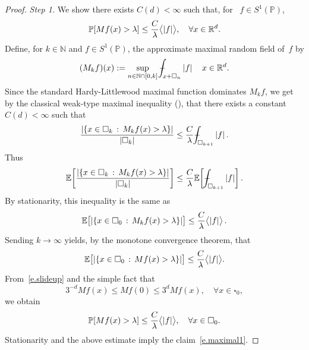 \documentclass[11pt]{article} %
\let\oldsquare\square %
\renewcommand{\square}{\oldsquare}
\numberwithin{equation}{section}
\theoremstyle{definition}
\let\originalleft\left
\let\originalright\right
\renewcommand{\left}{\mathopen{}\mathclose\bgroup\originalleft}
\renewcommand{\right}{\aftergroup\egroup\originalright}
\newcommand*{\N}{\ensuremath{\mathbb{N}}}
\newcommand*{\Rd}{\ensuremath{\mathbb{R}^d}}
\newcommand{\cu}{\square}
\renewcommand{\P}{\mathbb{P}}
\newcommand{\E}{\mathbb{E}}
\def\Xint#1{\mathchoice
{\XXint\displaystyle\textstyle{#1}}%
{\XXint\textstyle\scriptstyle{#1}}%
{\XXint\scriptstyle\scriptscriptstyle{#1}}%
{\XXint\scriptscriptstyle\scriptscriptstyle{#1}}%
\!\int}
\def\XXint#1#2#3{{\setbox0=\hbox{$#1{#2#3}{\int}$}
\vcenter{\hbox{$#2#3$}}\kern-.5\wd0}}
\def\fint{\Xint-}
\begin{document}
\begin{proof}
\emph{Step 1.}
We show there exists $C(d)<\infty$ such that, for~ $f\in S^1(\P)$,
\begin{equation}
\label{e.maximal1}
\P \left[ Mf(x) > \lambda \right] \leq \frac{C}{\lambda} \bigl \langle |f| \bigr\rangle, \quad \forall x\in \Rd.
\end{equation}
Define, for  $k\in\N$  and $f\in S^1(\P)$, the approximate maximal random field of~$f$ by 
\begin{equation}
(M_kf)(x):= 
\sup_{n\in \N \cap [0,k]} 
\fint_{x+\cu_n} |f| \, \quad x\in \Rd.
\end{equation}
Since the standard Hardy-Littlewood maximal function dominates $M_kf$, we get by the classical weak-type maximal inequality (\cite[Theorem 3.17]{Folland}), that there exists a constant~$C(d)<\infty$ such that 
\begin{equation}
\frac{\left| \left\{ x \in \cu_k \,:\, M_kf(x) > \lambda \right\} \right|}
{|\cu_k|}
\leq 
\frac{C}{\lambda}
\fint_{\cu_{k+1}} |f|\,. 
\end{equation}
Thus 
\begin{equation}
\E\left[ \frac{\left| \left\{ x \in \cu_k \,:\, M_kf(x) > \lambda \right\} \right|}
{|\cu_k|} \right]
\leq 
\frac{C}{\lambda}
\E \biggl[ 
\fint_{\cu_{k+1}} |f| \biggr]\,.
\end{equation}
By stationarity, this inequality is the same as 
\begin{equation}
\E\bigl[ \left| \left\{ x \in \cu_0 \,:\, M_kf(x) > \lambda \right\} \right| \bigr]
\leq
\frac{C}{\lambda} \bigl \langle |f| \bigr\rangle\,. 
\end{equation}
Sending $k\to \infty$ yields, by the monotone convergence theorem, that
\begin{equation}
\label{e.slideup}
\E\bigl[  \left| \left\{ x \in \cu_0 \,:\, Mf(x) > \lambda \right\} \right| \bigr]
\leq
\frac{C}{\lambda} \bigl \langle |f| \bigr\rangle. 
\end{equation}
From~\eqref{e.slideup} and the simple fact that
\begin{equation}
3^{-d} Mf (x) \leq Mf(0) \leq 3^d Mf(x), \quad \forall x\in \cu_0, 
\end{equation}
we obtain
\begin{equation}
\label{e.maximal11}
\P \left[ Mf(x) > \lambda \right] \leq \frac{C}{\lambda} \bigl \langle |f| \bigr\rangle, \quad \forall x\in \cu_0.
\end{equation}
Stationarity and the above estimate imply the claim~\eqref{e.maximal1}. 


\end{proof}
\end{document}
